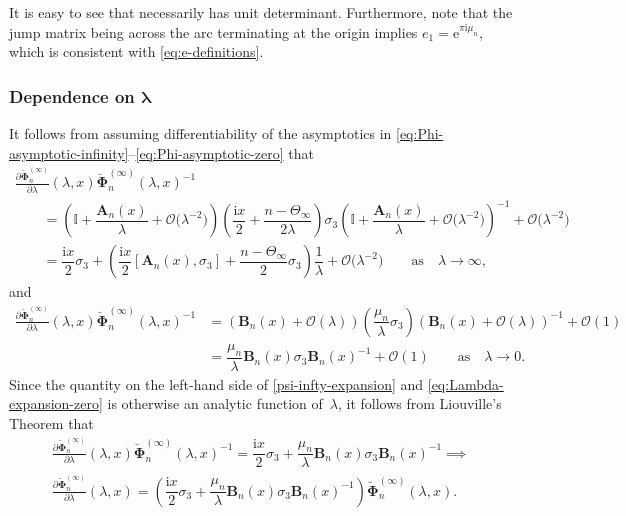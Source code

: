 \documentclass[11pt]{article}
\numberwithin{equation}{section}
\numberwithin{equation}{section}
\newcommand{\ee}{\mathrm{e}}
\newcommand{\ii}{\mathrm{i}}
\newcommand{\para}[1]{\breve{#1}}
\begin{document}
It is easy to see that \smash{$\para{\mathbf{\Phi}}_n^{(\infty)}(\lambda,x)$} necessarily has unit determinant. Furthermore, note that the jump matrix being  across the arc terminating at the origin implies
$e_1 = \ee^{\pi \ii \mu_n}$, which is consistent with \eqref{eq:e-definitions}.

\subsubsection[Dependence on lambda]{Dependence on $\boldsymbol{\lambda}$}
It follows from assuming differentiability of the asymptotics in \eqref{eq:Phi-asymptotic-infinity}--\eqref{eq:Phi-asymptotic-zero} that
\begin{gather}
 \frac{\partial\para{\boldsymbol \Phi}_{n}^{(\infty)}}{\partial\lambda}(\lambda,x) \para{\boldsymbol \Phi}^{(\infty)}_n(\lambda,x)^{-1}\nonumber\\
\qquad= \left(\mathbb I + \dfrac{\mathbf{A}_{n}(x)}{\lambda} + \mathcal{O}\big( \lambda^{-2}\big) \right)\left( \dfrac{\ii x}{2} + \dfrac{n - \Theta_\infty}{2 \lambda} \right) \sigma_3 \left(\mathbb I + \dfrac{\mathbf{A}_{n}(x)}{\lambda} + \mathcal{O}\big( \lambda^{-2}\big) \right)^{-1} + \mathcal{O}\big(\lambda^{-2}\big)\nonumber\\
 \qquad= \dfrac{\ii x}{2} \sigma_3 + \left( \dfrac{\ii x}{2} [\mathbf{A}_{n}(x), \sigma_3] + \dfrac{n - \Theta_\infty}{2} \sigma_3 \right) \dfrac{1}{\lambda} + \mathcal{O}\big( \lambda^{-2} \big) \qquad \text{as} \quad \lambda \to \infty,
\label{psi-infty-expansion}
\end{gather}
and
\begin{align}
 \frac{\partial\para{\boldsymbol \Phi}_{n}^{(\infty)}}{\partial\lambda}(\lambda,x)\para{\boldsymbol \Phi}^{(\infty)}_n(\lambda,x)^{-1} &= \left( \mathbf{B}_{n}(x) + \mathcal{O}(\lambda) \right) \left( \dfrac{\mu_n}{\lambda} \sigma_3 \right) \left( \mathbf{B}_{n}(x) + \mathcal{O}(\lambda) \right)^{-1} + \mathcal{O}(1)
 \nonumber\\
 &= \dfrac{\mu_n}{\lambda} \mathbf{B}_{n}(x) \sigma_3 \mathbf{B}_{n}(x)^{-1} + \mathcal{O}(1) \qquad \text{as} \quad \lambda \to 0.
\label{eq:Lambda-expansion-zero}
\end{align}
Since the quantity on the left-hand side of \eqref{psi-infty-expansion} and \eqref{eq:Lambda-expansion-zero} is otherwise an analytic function of~$\lambda$, it follows from Liouville's Theorem that
\begin{gather}
 \frac{\partial\para{\boldsymbol \Phi}_{n}^{(\infty)}}{\partial\lambda}(\lambda,x) \para{\boldsymbol \Phi}_n^{(\infty)}(\lambda,x)^{-1} = \dfrac{\ii x}{2} \sigma_3 + \dfrac{\mu_n}{\lambda} \mathbf{B}_{n}(x) \sigma_3 \mathbf{B}_{n}(x)^{-1} \implies\nonumber\\ \frac{\partial\para{\boldsymbol \Phi}_{n}^{(\infty)}}{\partial\lambda}(\lambda,x)= \left( \dfrac{\ii x}{2} \sigma_3 + \dfrac{\mu_n}{\lambda} \mathbf{B}_{n}(x) \sigma_3 \mathbf{B}_{n}(x)^{-1} \right) \para{\boldsymbol \Phi}_n^{(\infty)} (\lambda,x).
 \label{Lax-system-lambda}
\end{gather}
\end{document}
